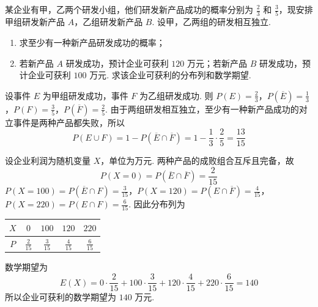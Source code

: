 \begin{problem}
某企业有甲，乙两个研发小组，他们研发新产品成功的概率分别为 \(\frac{2}{3}\) 和 \(\frac{3}{5}\)，现安排甲组研发新产品 \(A\)，乙组研发新产品 \(B\). 设甲，乙两组的研发相互独立.

\begin{enumerate}
\item 求至少有一种新产品研发成功的概率；
\item 若新产品 \(A\) 研发成功，预计企业可获利 \(120\text{ 万元}\)；若新产品 \(B\) 研发成功，预计企业可获利 \(100\text{ 万元}\). 求该企业可获利的分布列和数学期望.
\end{enumerate}

\begin{solution}
设事件 \(E\) 为甲组研发成功，事件 \(F\) 为乙组研发成功. 则
\(P(E)=\frac23\)，\(P(\overline E)=\frac13\)，\(P(F)=\frac35\)，\(P(\overline F)=\frac25\).
由于两组研发相互独立，至少有一种新产品成功的对立事件是两种产品都失败，所以
\[
P(E\cup F)=1-P(\overline E\cap\overline F)=1-\frac13\cdot\frac25=\frac{13}{15}
\]

设企业利润为随机变量 \(X\)，单位为万元. 两种产品的成败组合互斥且完备，故
\[
P(X=0)=P(\overline E\cap\overline F)=\frac{2}{15}
\]
\(P(X=100)=P(\overline E\cap F)=\frac{3}{15}\)，\(P(X=120)=P(E\cap\overline F)=\frac{4}{15}\)，\(P(X=220)=P(E\cap F)=\frac{6}{15}\).
因此分布列为
\begin{center}
\begin{tabular}{c|cccc}
\(X\) & \(0\) & \(100\) & \(120\) & \(220\)\\
\hline
\(P\) & \(\frac{2}{15}\) & \(\frac{3}{15}\) & \(\frac{4}{15}\) & \(\frac{6}{15}\)
\end{tabular}
\end{center}
数学期望为
\[
E(X)=0\cdot\frac{2}{15}+100\cdot\frac{3}{15}+120\cdot\frac{4}{15}+220\cdot\frac{6}{15}=140
\]
所以企业可获利的数学期望为 \(140\text{ 万元}\).
\end{solution}
\end{problem}

